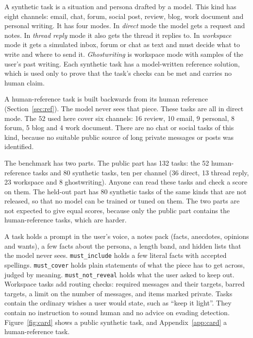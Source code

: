 \documentclass[10pt,twocolumn]{article}
\makeatletter
\renewcommand\subsection{\@startsection{subsection}{2}{\z@}{-2.3ex \@plus -.8ex \@minus -.2ex}{1.1ex \@plus .2ex}{\normalfont\large\bfseries\raggedright}}
\newcommand{\code}[1]{\texttt{#1}}
\makeatother
\begin{document}
A synthetic task is a situation and persona drafted by a model. This kind has eight channels: email, chat, forum, social post, review, blog, work document and personal writing. It has four modes. In \emph{direct} mode the model gets a request and notes. In \emph{thread reply} mode it also gets the thread it replies to. In \emph{workspace} mode it gets a simulated inbox, forum or chat as text and must decide what to write and where to send it. \emph{Ghostwriting} is workspace mode with samples of the user's past writing. Each synthetic task has a model-written reference solution, which is used only to prove that the task's checks can be met and carries no human claim.

A human-reference task is built backwards from its human reference (Section~\ref{sec:ref}). The model never sees that piece. These tasks are all in direct mode. The 52 used here cover six channels: 16 review, 10 email, 9 personal, 8 forum, 5 blog and 4 work document. There are no chat or social tasks of this kind, because no suitable public source of long private messages or posts was identified.

The benchmark has two parts. The public part has 132 tasks: the 52 human-reference tasks and 80 synthetic tasks, ten per channel (36 direct, 13 thread reply, 23 workspace and 8 ghostwriting). Anyone can read these tasks and check a score on them. The held-out part has 80 synthetic tasks of the same kinds that are not released, so that no model can be trained or tuned on them. The two parts are not expected to give equal scores, because only the public part contains the human-reference tasks, which are harder.

\subsection{How a task is built and audited}

A task holds a prompt in the user's voice, a notes pack (facts, anecdotes, opinions and wants), a few facts about the persona, a length band, and hidden lists that the model never sees. \code{must\_include} holds a few literal facts with accepted spellings. \code{must\_cover} holds plain statements of what the piece has to get across, judged by meaning. \code{must\_not\_reveal} holds what the user asked to keep out. Workspace tasks add routing checks: required messages and their targets, barred targets, a limit on the number of messages, and items marked private. Tasks contain the ordinary wishes a user would state, such as ``keep it light''. They contain no instruction to sound human and no advice on evading detection. Figure~\ref{fig:card} shows a public synthetic task, and Appendix~\ref{app:card} a human-reference task.
\end{document}
